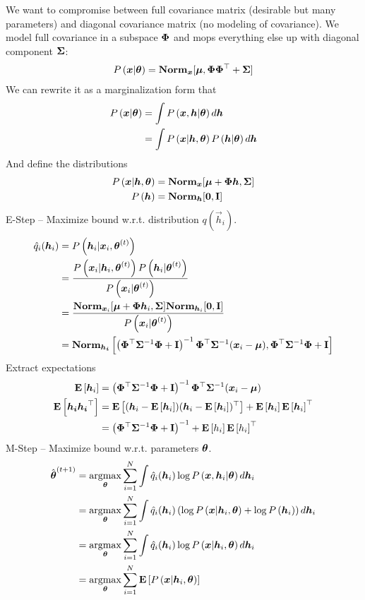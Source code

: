 We want to compromise between full covariance matrix (desirable but many parameters) and diagonal covariance matrix (no modeling of covariance). We model full covariance in a subspace $\mathbf{\Phi}$ and mops everything else up with diagonal component $\mathbf{\Sigma}$:
\begin{align*}
	P\left(\boldsymbol{x}|\boldsymbol{\theta}\right)=\mathbf{Norm}_{\boldsymbol{x}}[\boldsymbol{\mu},\mathbf{\Phi}\mathbf{\Phi}^\top+\mathbf{\Sigma}]
\end{align*}
We can rewrite it as a marginalization form that
\begin{align*}
	P\left(\boldsymbol{x}|\boldsymbol{\theta}\right)&=\int P\left(\boldsymbol{x},\boldsymbol{h}|\boldsymbol{\theta}\right)d\boldsymbol{h} \\
	&=\int P\left(\boldsymbol{x}|\boldsymbol{h},\boldsymbol{\theta}\right)P\left(\boldsymbol{h}|\boldsymbol{\theta}\right)d\boldsymbol{h}
\end{align*}
And define the distributions
\begin{align*}
	P\left(\boldsymbol{x}|\boldsymbol{h},\boldsymbol{\theta}\right)&=\mathbf{Norm}_{\boldsymbol{x}}[\boldsymbol{\mu}+\mathbf{\Phi}\boldsymbol{h},\mathbf{\Sigma}] \\
	P\left(\boldsymbol{h}\right)&=\mathbf{Norm}_{\boldsymbol{h}}[\boldsymbol{0},\mathbf{I}]
\end{align*}
E-Step -- Maximize bound w.r.t. distribution $q(\vec{h}_i)$.
\begin{align*}
	\hat{q}_i(\boldsymbol{h}_i)&=P\left(\boldsymbol{h}_i|\boldsymbol{x}_i,\boldsymbol{\theta}^{(t)}\right) \\
	&=\frac{P\left(\boldsymbol{x}_i|\boldsymbol{h}_i,\boldsymbol{\theta}^{(t)}\right)P\left(\boldsymbol{h}_i|\boldsymbol{\theta}^{(t)}\right)}{P\left(\boldsymbol{x}_i|\boldsymbol{\theta}^{(t)}\right)} \\
	&=\frac{\mathbf{Norm}_{\boldsymbol{x}_i}[\boldsymbol{\mu}+\mathbf{\Phi}\boldsymbol{h}_i,\mathbf{\Sigma}]\mathbf{Norm}_{\boldsymbol{h}_i}[\boldsymbol{0},\mathbf{I}]}{P\left(\boldsymbol{x}_i|\boldsymbol{\theta}^{(t)}\right)} \\
	&=\mathbf{Norm}_{\boldsymbol{h_i}}\left[\left(\mathbf{\Phi}^\top\mathbf{\Sigma}^{-1}\mathbf{\Phi}+\mathbf{I}\right)^{-1}\mathbf{\Phi}^\top\mathbf{\Sigma}^{-1}(\boldsymbol{x}_i-\boldsymbol{\mu}),\mathbf{\Phi}^\top\mathbf{\Sigma}^{-1}\mathbf{\Phi}+\mathbf{I}\right]
\end{align*}
Extract expectations
\begin{align*}
	\mathbf{E}\left[\boldsymbol{h}_i\right]&=\left(\mathbf{\Phi}^\top\mathbf{\Sigma}^{-1}\mathbf{\Phi}+\mathbf{I}\right)^{-1}\mathbf{\Phi}^\top\mathbf{\Sigma}^{-1}(\boldsymbol{x}_i-\boldsymbol{\mu}) \\
	\mathbf{E}\left[\boldsymbol{h_i}\boldsymbol{h_i}^\top\right]&=\mathbf{E}\left[(\boldsymbol{h}_i-\mathbf{E}\left[\boldsymbol{h}_i\right])(\boldsymbol{h}_i-\mathbf{E}\left[\boldsymbol{h}_i\right])^\top\right]+\mathbf{E}\left[\boldsymbol{h}_i\right]\mathbf{E}\left[\boldsymbol{h}_i\right]^\top \\
	&=\left(\mathbf{\Phi}^\top\mathbf{\Sigma}^{-1}\mathbf{\Phi}+\mathbf{I}\right)^{-1}+\mathbf{E}\left[h_i\right]\mathbf{E}\left[h_i\right]^\top
\end{align*}
M-Step -- Maximize bound w.r.t. parameters $\boldsymbol{\theta}$.
\begin{align*}
	\hat{\vec{\th}}^{(t+1)}&=\argmax_{\vec{\th}}\sum_{i=1}^N\int\hat{q}_i(\vec{h}_i)\log\P{\vec{x},\vec{h}_i|\vec{\th}}d\vec{h}_i \\
	&=\argmax_{\vec{\th}}\sum_{i=1}^N\int\hat{q}_i(\vec{h}_i)\left(\log\P{\vec{x}|\vec{h}_i,\vec{\th}}+\log\P{\vec{h}_i}\right)d\vec{h}_i \\
	&=\argmax_{\vec{\th}}\sum_{i=1}^N\int\hat{q}_i(\vec{h}_i)\log\P{\vec{x}|\vec{h}_i,\vec{\th}}d\vec{h}_i \\
	&=\argmax_{\vec{\th}}\sum_{i=1}^N\E{\P{\vec{x}|\vec{h}_i,\vec{\th}}}
\end{align*}
